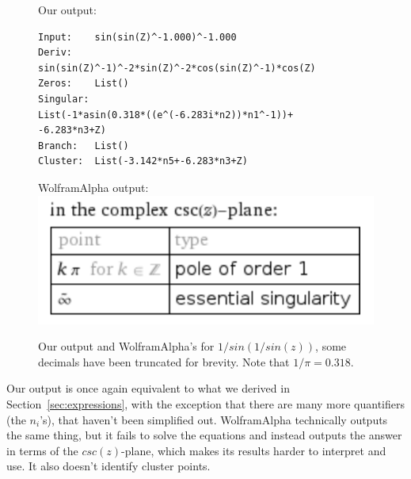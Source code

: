 \begin{figure}[H]
	\raggedright
	Our output: \\
	\begin{verbatim}
Input:    sin(sin(Z)^-1.000)^-1.000
Deriv:
sin(sin(Z)^-1)^-2*sin(Z)^-2*cos(sin(Z)^-1)*cos(Z)
Zeros:    List()
Singular:
List(-1*asin(0.318*((e^(-6.283i*n2))*n1^-1))+
-6.283*n3+Z)
Branch:   List()
Cluster:  List(-3.142*n5+-6.283*n3+Z)
	\end{verbatim} \vspace{7pt}
	WolframAlpha output:\\
	\includegraphics[width=0.6\columnwidth]{images/wpoles3}
	\caption{Our output and WolframAlpha's for $1/sin(1/sin(z))$, some decimals have been truncated for brevity. Note that $1/\pi=0.318.$}
	\label{fig:singEx3}
\end{figure}
Our output is once again equivalent to what we derived in Section~\ref{sec:expressions}, with the exception that there are many more quantifiers (the $n_i$'s), that haven't been simplified out. WolframAlpha technically outputs the same thing, but it fails to solve the equations and instead outputs the answer in terms of the $csc(z)$-plane, which makes its results harder to interpret and use. It also doesn't identify cluster points.
